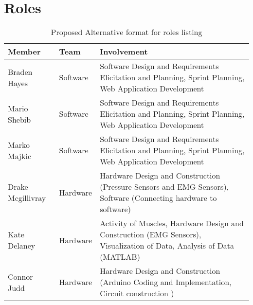 \newpage
\section{Roles}
\begin{table}[ht]
\begin{center}
\begin{tabular}{|m{3cm}|m{2cm}|m{22em}|}
\hline
Member & Team & Involvement \\ 
\hline
\hline
Braden Hayes & Software & Software Design and Requirements Elicitation and Planning, Sprint Planning, Web Application Development \\ 
\hline
Mario   Shebib & Software & Software Design and 
Requirements Elicitation and Planning, Sprint Planning, Web Application Development \\ 
\hline
Marko   Majkic & Software & Software Design and Requirements Elicitation and Planning, Sprint Planning, Web Application Development \\ 
\hline
Drake Mcgillivray & Hardware  & Hardware Design and Construction (Pressure Sensors and EMG Sensors), Software (Connecting hardware to software)\\ 
\hline
Kate   Delaney & Hardware & Activity of Muscles, Hardware Design and Construction (EMG Sensors), Visualization of Data, Analysis of Data (MATLAB)\\ 
\hline
Connor Judd & Hardware & Hardware Design and Construction (Arduino Coding and Implementation, Circuit construction )\\ 
\hline

\end{tabular}
\caption{Proposed Alternative format for roles listing}
\label{table:roles}
\end{center}
\end{table}